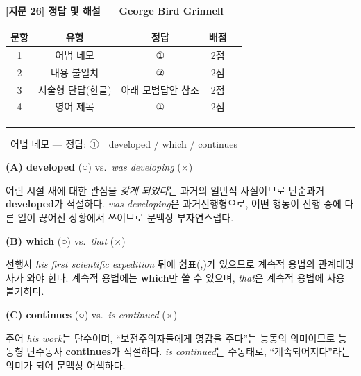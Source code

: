 \documentclass[11pt,a4paper]{article}
\newcommand{\qno}[1]{\par\vspace{10pt}\noindent{\sffamily\bfseries #1.}\ }
\begin{document}
\begin{center}
{\fontsize{15}{17}\selectfont\sffamily\bfseries [지문 26] 정답 및 해설 — George Bird Grinnell}
\end{center}
\vspace{6pt}

\begin{center}
\renewcommand{\arraystretch}{1.3}
\begin{tabular}{ccccc}
\toprule
문항 & 유형 & 정답 & 배점 \\
\midrule
1 & 어법 네모 & ① & 2점 \\
2 & 내용 불일치 & ② & 2점 \\
3 & 서술형 단답(한글) & 아래 모범답안 참조 & 2점 \\
4 & 영어 제목 & ① & 2점 \\
\bottomrule
\end{tabular}
\end{center}

\vspace{8pt}
\hrule
\vspace{8pt}

\qno{1}{\sffamily 어법 네모 — 정답: ①\ \ developed / which / continues}

\vspace{4pt}
\noindent\textbf{(A) developed} (○) vs.\ \textit{was developing} ($\times$)

\noindent 어린 시절 새에 대한 관심을 \textit{갖게 되었다}는 과거의 일반적 사실이므로 단순과거 \textbf{developed}가 적절하다.
\textit{was developing}은 과거진행형으로, 어떤 행동이 진행 중에 다른 일이 끊어진 상황에서 쓰이므로 문맥상 부자연스럽다.

\vspace{6pt}
\noindent\textbf{(B) which} (○) vs.\ \textit{that} ($\times$)

\noindent 선행사 \textit{his first scientific expedition} 뒤에 쉼표(,)가 있으므로 계속적 용법의 관계대명사가 와야 한다.
계속적 용법에는 \textbf{which}만 쓸 수 있으며, \textit{that}은 계속적 용법에 사용 불가하다.

\vspace{6pt}
\noindent\textbf{(C) continues} (○) vs.\ \textit{is continued} ($\times$)

\noindent 주어 \textit{his work}는 단수이며, ``보전주의자들에게 영감을 주다''는 능동의 의미이므로 능동형 단수동사 \textbf{continues}가 적절하다.
\textit{is continued}는 수동태로, ``계속되어지다''라는 의미가 되어 문맥상 어색하다.
\end{document}
